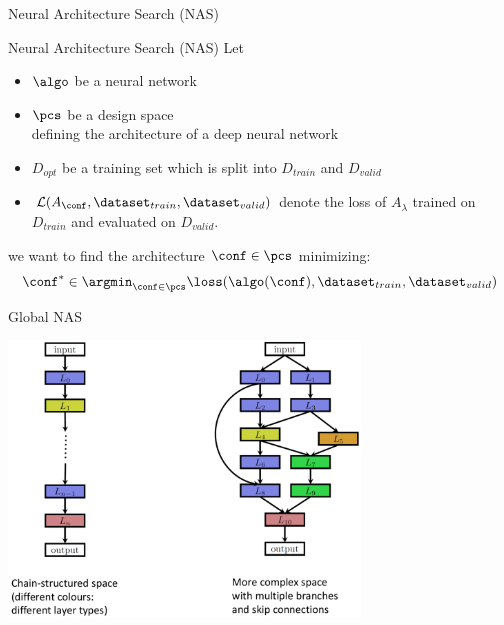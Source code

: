 \begin{frame}[c]{Neural Architecture Search (NAS)}

\begin{block}{Neural Architecture Search (NAS)}
Let
\begin{itemize}
  \item $\algo$ be a \alert{neural network}
  \item $\pcs$ be a design space\\ \alert{defining the architecture of a deep neural network}
  \item $D_{opt}$ be a training set which is split into $D_{train}$ and $D_{valid}$ 
  \item $\mathcal{L}(A_\conf, \dataset_{train}, \dataset_{valid})$ denote the loss of $A_\lambda$ trained on $D_{train}$ and evaluated on $D_{valid}$.
  
\end{itemize}
we want to find the architecture $\conf \in \pcs$ minimizing:
\begin{equation}
\conf^* \in \argmin_{\conf \in \pcs} \loss(\algo(\conf), \dataset_{train}, \dataset_{valid}) \nonumber
\end{equation}
\end{block}

\end{frame}
\begin{frame}[c]{Global NAS}

\centering
\includegraphics[width=0.7\textwidth]{images/nas_global.png}

\end{frame}
